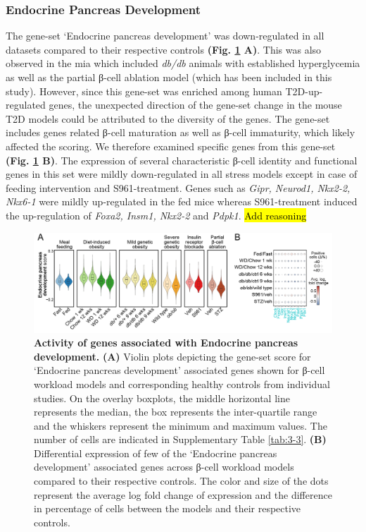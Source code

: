 \subsubsection{Endocrine Pancreas Development}
The gene-set `Endocrine pancreas development' was down-regulated in all datasets compared to their respective controls \textbf{(Fig. \ref{fig:chp3_gs_endo} A)}. This was also observed in the \gls{mia} which included \textit{db/db} animals with established hyperglycemia as well as the partial β-cell ablation model (which has been included in this study). However, since this gene-set was enriched among human T2D-up-regulated genes, the unexpected direction of the gene-set change in the mouse T2D models could be attributed to the diversity of the genes. The gene-set includes genes related β-cell maturation as well as β-cell immaturity, which likely affected the scoring. We therefore examined specific genes from this gene-set \textbf{(Fig. \ref{fig:chp3_gs_endo} B)}. The expression of several characteristic β-cell identity and functional genes in this set were mildly down-regulated in all stress models except in case of feeding intervention and S961-treatment. Genes such as \textit{Gipr, Neurod1, Nkx2-2, Nkx6-1} were mildly up-regulated in the fed mice whereas S961-treatment induced the up-regulation of \textit{Foxa2, Insm1, Nkx2-2}  and \textit{Pdpk1}. \hl{Add reasoning}

\begin{figure}[H]
\centering
\includegraphics[width=\linewidth]{Chapter5/Fig/F3-13-01.png}
\caption[Scoring of gene-set - \textit{Endocrine pancreas development}]{\textbf{Activity of genes associated with Endocrine pancreas development.} \textbf{(A)} Violin plots depicting the gene-set score for `Endocrine pancreas development' associated genes shown for β-cell workload models and corresponding healthy controls from individual studies. On the overlay boxplots, the middle horizontal line represents the median, the box represents the inter-quartile range and the whiskers represent the minimum and maximum values. The number of cells are indicated in Supplementary Table \ref{tab:3-3}. \textbf{(B)} Differential expression of few of the `Endocrine pancreas development' associated genes across β-cell workload models compared to their respective controls. The color and size of the dots represent the average log fold change of expression and the difference in percentage of cells between the models and their respective controls.}
\label{fig:chp3_gs_endo}
\end{figure}


